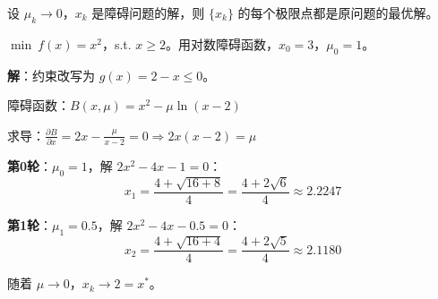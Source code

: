 \begin{theorem}[内点法收敛性]
设 $\mu_k \to 0$，$x_k$ 是障碍问题的解，则 $\{x_k\}$ 的每个极限点都是原问题的最优解。
\end{theorem}

\begin{example}\label{ex:interior}
$\min\ f(x) = x^2$，s.t. $x \geq 2$。用对数障碍函数，$x_0 = 3$，$\mu_0 = 1$。

\textbf{解}：约束改写为 $g(x) = 2 - x \leq 0$。

障碍函数：$B(x, \mu) = x^2 - \mu \ln(x - 2)$

求导：$\frac{\partial B}{\partial x} = 2x - \frac{\mu}{x-2} = 0 \Rightarrow 2x(x-2) = \mu$

\textbf{第0轮}：$\mu_0 = 1$，解 $2x^2 - 4x - 1 = 0$：
\[
x_1 = \frac{4 + \sqrt{16+8}}{4} = \frac{4 + 2\sqrt{6}}{4} \approx 2.2247
\]

\textbf{第1轮}：$\mu_1 = 0.5$，解 $2x^2 - 4x - 0.5 = 0$：
\[
x_2 = \frac{4 + \sqrt{16+4}}{4} = \frac{4 + 2\sqrt{5}}{4} \approx 2.1180
\]

随着 $\mu \to 0$，$x_k \to 2 = x^*$。
\end{example}

